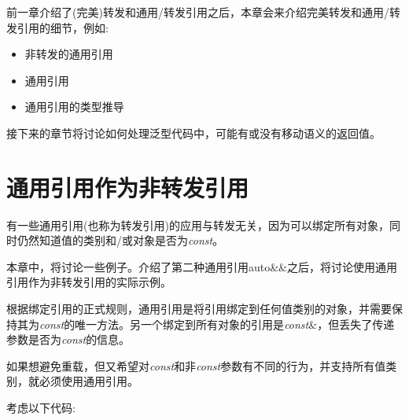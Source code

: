 
前一章介绍了(完美)转发和通用/转发引用之后，本章会来介绍完美转发和通用/转发引用的细节，例如:\par

\begin{itemize}
  \item 非转发的通用引用
  \item 通用引用
  \item 通用引用的类型推导
\end{itemize}

接下来的章节将讨论如何处理泛型代码中，可能有或没有移动语义的返回值。\par


\section{通用引用作为非转发引用}

有一些通用引用(也称为转发引用)的应用与转发无关，因为可以绑定所有对象，同时仍然知道值的类别和/或对象是否为\textit{const}。\par

本章中，将讨论一些例子。介绍了第二种通用引用auto\&\&之后，将讨论使用通用引用作为非转发引用的实际示例。\par


根据绑定引用的正式规则，通用引用是将引用绑定到任何值类别的对象，并需要保持其为\textit{const}的唯一方法。另一个绑定到所有对象的引用是\textit{const}\&，但丢失了传递参数是否为\textit{const}的信息。\par


如果想避免重载，但又希望对\textit{const}和非\textit{const}参数有不同的行为，并支持所有值类别，就必须使用通用引用。\par

考虑以下代码:\par

